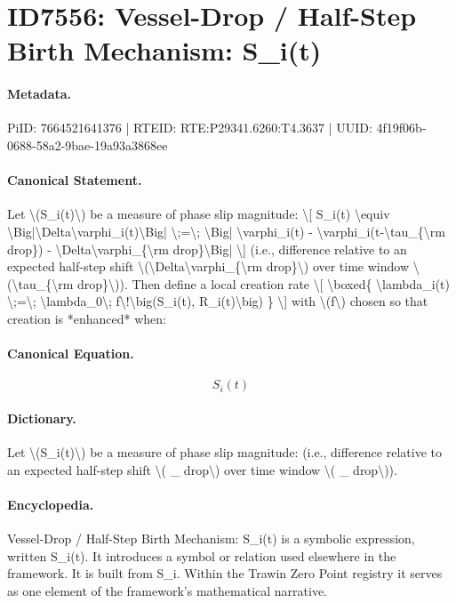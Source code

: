 \section*{ID7556: Vessel-Drop / Half-Step Birth Mechanism: S\_i(t)}
\paragraph{Metadata.}
PiID: 7664521641376 | RTEID: RTE:P29341.6260:T4.3637 | UUID: 4f19f06b-0688-58a2-9bae-19a93a3868ee

\paragraph{Canonical Statement.}
Let \textbackslash{}(S\_i(t)\textbackslash{}) be a measure of phase slip magnitude: \textbackslash{}[ S\_i(t) \textbackslash{}equiv \textbackslash{}Big|\textbackslash{}Delta\textbackslash{}varphi\_i(t)\textbackslash{}Big| \textbackslash{};=\textbackslash{}; \textbackslash{}Big| \textbackslash{}varphi\_i(t) - \textbackslash{}varphi\_i(t-\textbackslash{}tau\_\{\textbackslash{}rm drop\}) - \textbackslash{}Delta\textbackslash{}varphi\_\{\textbackslash{}rm drop\}\textbackslash{}Big| \textbackslash{}] (i.e., difference relative to an expected half-step shift \textbackslash{}(\textbackslash{}Delta\textbackslash{}varphi\_\{\textbackslash{}rm drop\}\textbackslash{}) over time window \textbackslash{}(\textbackslash{}tau\_\{\textbackslash{}rm drop\}\textbackslash{})). Then define a local creation rate \textbackslash{}[ \textbackslash{}boxed\{ \textbackslash{}lambda\_i(t) \textbackslash{};=\textbackslash{}; \textbackslash{}lambda\_0\textbackslash{}; f\textbackslash{}!\textbackslash{}big(S\_i(t), R\_i(t)\textbackslash{}big) \} \textbackslash{}] with \textbackslash{}(f\textbackslash{}) chosen so that creation is *enhanced* when:

\paragraph{Canonical Equation.}
\[
S_i(t)
\]

\paragraph{Dictionary.}
Let \textbackslash{}(S\_i(t)\textbackslash{}) be a measure of phase slip magnitude: (i.e., difference relative to an expected half-step shift \textbackslash{}( \_ drop\textbackslash{}) over time window \textbackslash{}( \_ drop\textbackslash{})).

\paragraph{Encyclopedia.}
Vessel-Drop / Half-Step Birth Mechanism: S\_i(t) is a symbolic expression, written S\_i(t). It introduces a symbol or relation used elsewhere in the framework. It is built from S\_i. Within the Trawin Zero Point registry it serves as one element of the framework's mathematical narrative.
